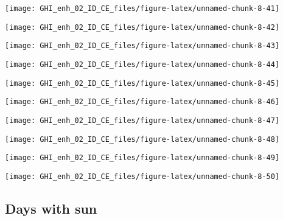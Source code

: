 \documentclass[
  10pt,
  a4paper,oneside]{article}
\begin{document}
\begin{center}\texttt{[image: GHI\_enh\_02\_ID\_CE\_files/figure-latex/unnamed-chunk-8-41]} \end{center}

\begin{center}\texttt{[image: GHI\_enh\_02\_ID\_CE\_files/figure-latex/unnamed-chunk-8-42]} \end{center}

\begin{center}\texttt{[image: GHI\_enh\_02\_ID\_CE\_files/figure-latex/unnamed-chunk-8-43]} \end{center}

\begin{center}\texttt{[image: GHI\_enh\_02\_ID\_CE\_files/figure-latex/unnamed-chunk-8-44]} \end{center}

\begin{center}\texttt{[image: GHI\_enh\_02\_ID\_CE\_files/figure-latex/unnamed-chunk-8-45]} \end{center}

\begin{center}\texttt{[image: GHI\_enh\_02\_ID\_CE\_files/figure-latex/unnamed-chunk-8-46]} \end{center}

\begin{center}\texttt{[image: GHI\_enh\_02\_ID\_CE\_files/figure-latex/unnamed-chunk-8-47]} \end{center}

\begin{center}\texttt{[image: GHI\_enh\_02\_ID\_CE\_files/figure-latex/unnamed-chunk-8-48]} \end{center}

\begin{center}\texttt{[image: GHI\_enh\_02\_ID\_CE\_files/figure-latex/unnamed-chunk-8-49]} \end{center}

\begin{center}\texttt{[image: GHI\_enh\_02\_ID\_CE\_files/figure-latex/unnamed-chunk-8-50]} \end{center}

\FloatBarrier

\hypertarget{days-with-sun}{%
\subsection{Days with sun}\label{days-with-sun}}
\end{document}
